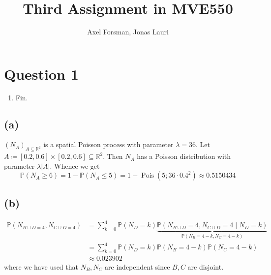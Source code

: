 \documentclass{article}
\title{Third Assignment in MVE550}
\author{Axel Forsman, Jonas Lauri}
\DeclareMathOperator\Poisson{Pois}
\begin{document}

\section{Question 1}
\begin{enumerate}[label=(\alph*)]
	\item Fin.
\end{enumerate}

\subsection{(a)}
$(N_A)_{A \subseteq \mathbb R^2}$ is a spatial Poisson process
with parameter $\lambda = 36$.
Let $A \coloneqq [0.2, 0.6] \times [0.2, 0.6] \subseteq \mathbb R^2$.
Then $N_A$ has a Poisson distribution with parameter $\lambda \lvert A \rvert$.
Whence we get
$$ \mathbb P(N_A \ge 6) = 1 - \mathbb P(N_A \le 5) = 1 - \Poisson(5; 36 \cdot 0.4^2)
	\approx \num{0.5150434} $$

	\subsection{(b)}
	\begin{center}
	\end{center}

\begin{align*}
	\mathbb P(N_{B \cup D = 4}, N_{C \cup D = 4}) &= \sum_{k=0}^4 \mathbb P(N_D = k) \underbrace{\mathbb P(N_{B \cup D} = 4, N_{C \cup D} = 4 \mid N_D = k)}_{\mathbb P(N_B = 4 - k, N_C = 4 - k)} \\
	&= \sum_{k=0}^4 \mathbb P(N_D = k) \mathbb P(N_B = 4 - k) \mathbb P(N_C = 4 - k) \\
	&\approx \num{0.023902}
\end{align*}
where we have used that $N_B, N_C$ are independent since $B, C$ are disjoint.

\begin{comment}
	\appendix
	\section{Appendix, R code}
	
\end{comment}
\end{document}
